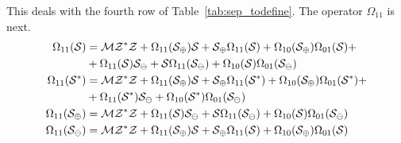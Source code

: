 \documentclass[12pt, a4paper, twoside]{report}
\begin{document}
This deals with the fourth row of Table~\ref{tab:sep_todefine}. The operator $\Omega_{11}$ is next.
\begin{align}
  \begin{aligned}
    \Omega_{11}(\S) %
    &= \M\Zstar\Z + \Omega_{11}(\S_\oplus)\S + \S_\oplus\Omega_{11}(\S) + \Omega_{10}(\S_\oplus)\Omega_{01}(\S) +\\
    &+\Omega_{11}(\S)\S_\ominus + \S\Omega_{11}(\S_\ominus) + \Omega_{10}(\S)\Omega_{01}(\S_\ominus)\\
    \Omega_{11}(\Sstar)%
    &= \M\Zstar\Z + \Omega_{11}(\S_\oplus)\S + \S_\oplus\Omega_{11}(\Sstar) + \Omega_{10}(\S_\oplus)\Omega_{01}(\Sstar) +\\
    &+\Omega_{11}(\Sstar)\S_\ominus + \Omega_{10}(\Sstar)\Omega_{01}(\S_\ominus)\\
    \Omega_{11}(\S_{\oplus})%
      &= \M\Zstar\Z + \Omega_{11}(\S)\S_\ominus + \S\Omega_{11}(\S_\ominus) + \Omega_{10}(\S)\Omega_{01}(\S_\ominus)\\
    \Omega_{11}(\S_\ominus) %
    &= \M\Zstar\Z + \Omega_{11}(\S_\oplus)\S + \S_\oplus\Omega_{11}(\S) + \Omega_{10}(\S_\oplus)\Omega_{01}(\S)
  \end{aligned}
\end{align}
\end{document}
